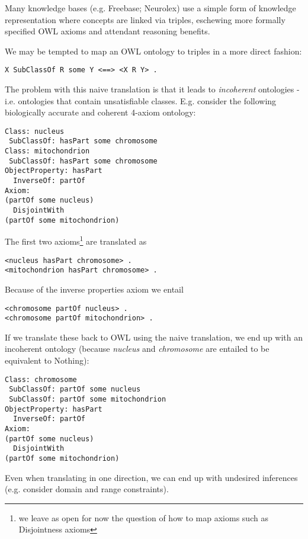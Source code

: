 \documentclass{my}
\begin{document}
Many knowledge bases (e.g. Freebase; Neurolex) use a simple form of
knowledge representation where concepts are linked via triples,
eschewing more formally specified OWL axioms and attendant reasoning
benefits.

We may be tempted to map an OWL ontology to triples in a more direct
fashion:

\begin{verbatim}
X SubClassOf R some Y <==> <X R Y> .
\end{verbatim}

The problem with this naive translation is that it leads to
\emph{incoherent} ontologies - i.e. ontologies that contain
unsatisfiable classes. E.g. consider the following biologically
accurate and coherent 4-axiom ontology:

\begin{verbatim}
Class: nucleus
 SubClassOf: hasPart some chromosome
Class: mitochondrion 
 SubClassOf: hasPart some chromosome
ObjectProperty: hasPart
  InverseOf: partOf
Axiom:
(partOf some nucleus) 
  DisjointWith 
(partOf some mitochondrion)
\end{verbatim}

The first two axioms\footnote{we leave as open for now the question of
  how to map axioms such as Disjointness axioms} are translated as

\begin{verbatim}
<nucleus hasPart chromosome> .
<mitochondrion hasPart chromosome> .
\end{verbatim}

Because of the inverse properties axiom we entail

\begin{verbatim}
<chromosome partOf nucleus> .
<chromosome partOf mitochondrion> .
\end{verbatim}

If we translate these back to OWL using the naive translation, we end
up with an incoherent ontology (because \emph{nucleus} and
\emph{chromosome} are entailed to be equivalent to Nothing):

\begin{verbatim}
Class: chromosome
 SubClassOf: partOf some nucleus
 SubClassOf: partOf some mitochondrion
ObjectProperty: hasPart
  InverseOf: partOf
Axiom:
(partOf some nucleus) 
  DisjointWith 
(partOf some mitochondrion)
\end{verbatim}

Even when translating in one direction, we can end up with undesired
inferences (e.g. consider domain and range constraints).
\end{document}
